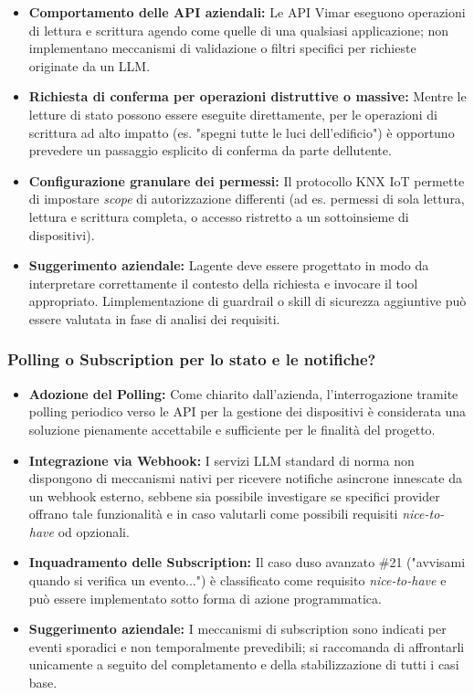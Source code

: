 \documentclass[12pt,a4paper]{article}
\newcommand{\tightlist}{\setlength{\itemsep}{1pt}\setlength{\parskip}{0pt}}
\begin{document}
\begin{itemize}
\tightlist
\item \textbf{Comportamento delle API aziendali:} Le API Vimar eseguono operazioni di lettura e scrittura agendo come quelle di una qualsiasi applicazione; non implementano meccanismi di validazione o filtri specifici per richieste originate da un LLM.
\item \textbf{Richiesta di conferma per operazioni distruttive o massive:} Mentre le letture di stato possono essere eseguite direttamente, per le operazioni di scrittura ad alto impatto (es. "spegni tutte le luci dell'edificio") è opportuno prevedere un passaggio esplicito di conferma da parte dell\textquotesingle utente.
\item \textbf{Configurazione granulare dei permessi:} Il protocollo KNX IoT permette di impostare \emph{scope} di autorizzazione differenti (ad es. permessi di sola lettura, lettura e scrittura completa, o accesso ristretto a un sottoinsieme di dispositivi).
\item \textbf{Suggerimento aziendale:} L\textquotesingle agente deve essere progettato in modo da interpretare correttamente il contesto della richiesta e invocare il tool appropriato. L\textquotesingle implementazione di guardrail o skill di sicurezza aggiuntive può essere valutata in fase di analisi dei requisiti.
\end{itemize}

\hypertarget{polling-o-subscription-per-lo-stato-e-le-notifiche}{%
\subsubsection{\texorpdfstring{Polling o Subscription per lo stato e le notifiche?}{Polling o Subscription per lo stato e le notifiche?}}}

\begin{itemize}
\tightlist
\item \textbf{Adozione del Polling:} Come chiarito dall'azienda, l'interrogazione tramite polling periodico verso le API per la gestione dei dispositivi è considerata una soluzione pienamente accettabile e sufficiente per le finalità del progetto.
\item \textbf{Integrazione via Webhook:} I servizi LLM standard di norma non dispongono di meccanismi nativi per ricevere notifiche asincrone innescate da un webhook esterno, sebbene sia possibile investigare se specifici provider offrano tale funzionalità e in caso valutarli come possibili requisiti \emph{nice-to-have} od opzionali.
\item \textbf{Inquadramento delle Subscription:} Il caso d\textquotesingle uso avanzato \#21 ("avvisami quando si verifica un evento...") è classificato come requisito \emph{nice-to-have} e può essere implementato sotto forma di azione programmatica.
\item \textbf{Suggerimento aziendale:} I meccanismi di subscription sono indicati per eventi sporadici e non temporalmente prevedibili; si raccomanda di affrontarli unicamente a seguito del completamento e della stabilizzazione di tutti i casi base.
\end{itemize}
\end{document}
